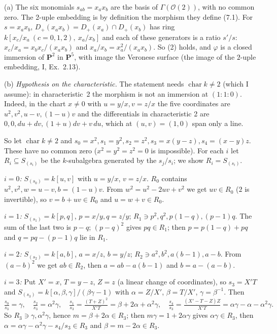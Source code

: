 \documentclass[11pt]{article}
\begin{document}
(a) The six monomials $s_{ab}=x_ax_b$ are the basis of $\Gamma(\mathcal O(2))$, with no common zero. The 2-uple embedding is by definition the morphism they define (7.1). For $s=x_ax_b$, $D_+(x_ax_b)=D_+(x_a)\cap D_+(x_b)$ has ring $k[x_c/x_a\ (c=0,1,2),\ x_a/x_b]$ and each of these generators is a ratio $s'/s$: $x_c/x_a=x_bx_c/(x_ax_b)$ and $x_a/x_b=x_a^2/(x_ax_b)$. So (2) holds, and $\varphi$ is a closed immersion of $\mathbf P^2$ in $\mathbf P^5$, with image the Veronese surface (the image of the $2$-uple embedding, I, Ex.~2.13).

(b) \emph{Hypothesis on the characteristic.} The statement needs $\operatorname{char}k\ne2$ (which I assume): in characteristic~2 the morphism is not an immersion at $(1:1:0)$. Indeed, in the chart $x\ne0$ with $u=y/x,v=z/x$ the five coordinates are $u^2,v^2,u-v,(1-u)v$ and the differentials in characteristic 2 are $0,0,du+dv,(1+u)dv+v\,du$, which at $(u,v)=(1,0)$ span only a line.

So let $\operatorname{char}k\ne2$ and $s_0=x^2,s_1=y^2,s_2=z^2,s_3=x(y-z),s_4=(x-y)z$. These have no common zero ($x^2=y^2=z^2=0$ is impossible). For each $i$ let $R_i\subseteq S_{(s_i)}$ be the $k$-subalgebra generated by the $s_j/s_i$; we show $R_i=S_{(s_i)}$.

\emph{$i=0$:} $S_{(s_0)}=k[u,v]$ with $u=y/x$, $v=z/x$. $R_0$ contains $u^2,v^2,w=u-v,b=(1-u)v$. From $w^2=u^2-2uv+v^2$ we get $uv\in R_0$ ($2$ is invertible), so $v=b+uv\in R_0$ and $u=w+v\in R_0$.

\emph{$i=1$:} $S_{(s_1)}=k[p,q]$, $p=x/y,q=z/y$; $R_1\ni p^2,q^2,p(1-q),(p-1)q$. The sum of the last two is $p-q$; $(p-q)^2$ gives $pq\in R_1$; then $p=p(1-q)+pq$ and $q=pq-(p-1)q$ lie in $R_1$.

\emph{$i=2$:} $S_{(s_2)}=k[a,b]$, $a=x/z$, $b=y/z$; $R_2\ni a^2,b^2,a(b-1),a-b$. From $(a-b)^2$ we get $ab\in R_2$, then $a=ab-a(b-1)$ and $b=a-(a-b)$.

\emph{$i=3$:} Put $X'=x$, $T=y-z$, $Z=z$ (a linear change of coordinates), so $s_3=X'T$ and $S_{(s_3)}=k[\alpha,\beta,\gamma]/(\beta\gamma-1)$ with $\alpha=Z/X'$, $\beta=T/X'$, $\gamma=\beta^{-1}$. Then
\[
\tfrac{s_0}{s_3}=\gamma,\quad \tfrac{s_2}{s_3}=\alpha^2\gamma,\quad \tfrac{s_1}{s_3}=\tfrac{(T+Z)^2}{X'T}=\beta+2\alpha+\alpha^2\gamma,\quad \tfrac{s_4}{s_3}=\tfrac{(X'-T-Z)Z}{X'T}=\alpha\gamma-\alpha-\alpha^2\gamma .
\]
So $R_3\ni\gamma,\alpha^2\gamma$, hence $m=\beta+2\alpha\in R_3$; then $m\gamma=1+2\alpha\gamma$ gives $\alpha\gamma\in R_3$, then $\alpha=\alpha\gamma-\alpha^2\gamma-s_4/s_3\in R_3$ and $\beta=m-2\alpha\in R_3$.
\end{document}
